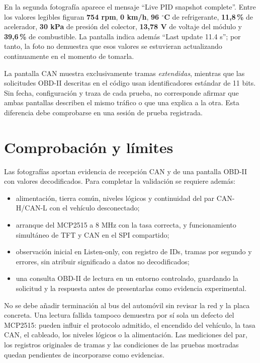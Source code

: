 \documentclass[11pt,letterpaper]{article}
\begin{document}
En la segunda fotografía aparece el mensaje ``Live PID snapshot complete''.
Entre los valores legibles figuran \textbf{754 rpm}, \textbf{0 km/h},
\textbf{96 $^\circ$C} de refrigerante, \textbf{11,8\,\%} de acelerador,
\textbf{30 kPa} de presión del colector, \textbf{13,78 V} de voltaje del
módulo y \textbf{39,6\,\%} de combustible. La pantalla indica además
``Last update 11.4 s''; por tanto, la foto no demuestra que esos valores se
estuvieran actualizando continuamente en el momento de tomarla.

La pantalla CAN muestra exclusivamente tramas \emph{extendidas}, mientras que
las solicitudes OBD-II descritas en el código usan identificadores estándar
de 11 bits. Sin fecha, configuración y traza de cada prueba, no corresponde
afirmar que ambas pantallas describen el mismo tráfico o que una explica a la
otra. Esta diferencia debe comprobarse en una sesión de prueba registrada.

\section{Comprobación y límites}
Las fotografías aportan evidencia de recepción CAN y de una pantalla OBD-II
con valores decodificados. Para completar la validación se requiere además:
\begin{itemize}
  \item alimentación, tierra común, niveles lógicos y continuidad del par
    CAN-H/CAN-L con el vehículo desconectado;
  \item arranque del MCP2515 a 8 MHz con la tasa correcta, y funcionamiento
    simultáneo de TFT y CAN en el SPI compartido;
  \item observación inicial en Listen-only, con registro de IDs, tramas por
    segundo y errores, sin atribuir significado a datos no decodificados;
  \item una consulta OBD-II de lectura en un entorno controlado, guardando la
    solicitud y la respuesta antes de presentarlas como evidencia experimental.
\end{itemize}

No se debe añadir terminación al bus del automóvil sin revisar la red y la
placa concreta. Una lectura fallida tampoco demuestra por sí sola un defecto
del MCP2515: pueden influir el protocolo admitido, el encendido del vehículo,
la tasa CAN, el cableado, los niveles lógicos o la alimentación. Las
mediciones del par, los registros originales de tramas y las condiciones de
las pruebas mostradas quedan pendientes de incorporarse como evidencias.
\end{document}
